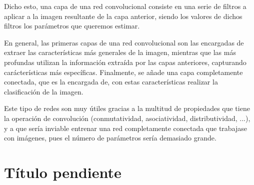 \documentclass[
  a4paper,
  12pt,
  spanish,
]{scrartcl}
\theoremstyle{teorema-style}
\begin{document}
Dicho esto, una capa de una red convolucional consiste en una serie de filtros a aplicar a la imagen resultante de la capa anterior, siendo los valores de dichos filtros los parámetros que queremos estimar.

En general, las primeras capas de una red convolucional son las encargadas de extraer las características más generales de la imagen, mientras que las más profundas utilizan la información extraída por las capas anteriores, capturando carácterísticas más específicas. Finalmente, se añade una capa completamente conectada, que es la encargada de, con estas características realizar la clasificación de la imagen.

Este tipo de redes son muy útiles gracias a la multitud de propiedades que tiene la operación de convolución (conmutatividad, asociatividad, distributividad, ...), y a que sería inviable entrenar una red completamente conectada que trabajase con imágenes, pues el número de parámetros sería demasiado grande.

\section{Título pendiente}
\end{document}
